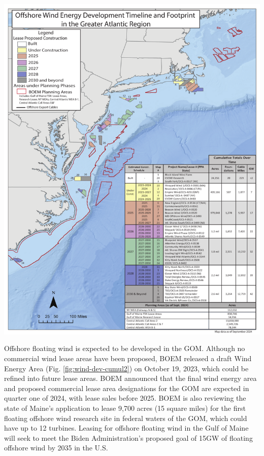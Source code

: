 \documentclass[
  10pt,
]{article}
\let\origfigure\figure
\let\endorigfigure\endfigure
\renewenvironment{figure}[1][2] {
    \expandafter\origfigure\expandafter[H]
} {
    \endorigfigure
}
\begin{document}
\begin{figure}

{\centering \includegraphics[width=0.9\linewidth]{SOE-NEFMC_files/figure-latex/wind-dev-cumul2-1} 

}

\caption{All Northeast Project areas by year construction ends (each project has 2 year construction period).}\label{fig:wind-dev-cumul2}
\end{figure}
\newpage

Offshore floating wind is expected to be developed in the GOM. Although no commercial wind lease areas have been proposed, BOEM released a draft Wind Energy Area (Fig. \ref{fig:wind-dev-cumul2}) on October 19, 2023, which could be refined into future lease areas. BOEM announced that the final wind energy area and proposed commercial lease area designations for the GOM are expected in quarter one of 2024, with lease sales before 2025. BOEM is also reviewing the state of Maine's application to lease 9,700 acres (15 square miles) for the first floating offshore wind research site in federal waters of the GOM, which could have up to 12 turbines. Leasing for offshore floating wind in the Gulf of Maine will seek to meet the Biden Administration's proposed goal of 15GW of floating offshore wind by 2035 in the U.S.
\end{document}
